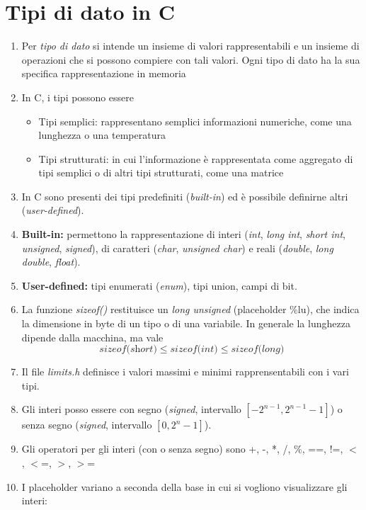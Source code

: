\documentclass[a4paper,11pt]{article}
\begin{document}
\section{Tipi di dato in C}
\begin{enumerate}[resume]
	\item Per \textit{tipo di dato} si intende un insieme di valori rappresentabili e un insieme di operazioni che si possono compiere con tali valori. Ogni tipo di dato ha la sua specifica rappresentazione in memoria
	\item In C, i tipi possono essere
	\begin{itemize}
		\item Tipi semplici: rappresentano semplici informazioni numeriche, come una lunghezza o una temperatura
		\item Tipi strutturati: in cui l'informazione è rappresentata come aggregato di tipi semplici o di altri tipi strutturati, come una matrice	
	\end{itemize}
	\item In C sono presenti dei tipi predefiniti (\textit{built-in}) ed è possibile definirne altri (\textit{user-defined}).
	\item \textbf{Built-in:} permettono la rappresentazione di interi (\textit{int}, \textit{long int}, \textit{short int}, \textit{unsigned}, \textit{signed}), di caratteri (\textit{char}, \textit{unsigned char}) e reali (\textit{double}, \textit{long double}, \textit{float}).
	\item\textbf{User-defined:} tipi enumerati (\textit{enum}), tipi union, campi di bit.
	\item La funzione \textit{sizeof()} restituisce un \textit{long unsigned} (placeholder \%lu), che indica la dimensione in byte di un tipo o di una variabile. In generale la lunghezza dipende dalla macchina, ma vale
	\[\textit{sizeof(short)}\leq\textit{sizeof(int)}\leq\textit{sizeof(long)}\]
	\item Il file \textit{limits.h} definisce i valori massimi e minimi rapprensentabili con i vari tipi.
	\item Gli interi posso essere con segno (\textit{signed}, intervallo $[-2^{n-1},2^{n-1}-1]$) o senza segno (\textit{signed}, intervallo $[0, 2^{n}-1]$).
	\item Gli operatori per gli interi (con o senza segno) sono +, -, *, /, \%, ==, !=, $<$, $<$=, $>$, $>$=
	\item I placeholder variano a seconda della base in cui si vogliono visualizzare gli interi:
	\begin{itemize}

\end{itemize}
\end{enumerate}
\end{document}
